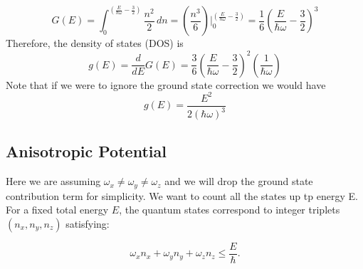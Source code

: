 \documentclass{article}
\numberwithin{equation}{section}
\numberwithin{equation}{subsection}
\begin{document}
\begin{equation}
    G(\mathit{E}) = \int_{0}^{(\frac{E}{\hbar\omega}-\frac{3}{2})} \frac{\mathit{n}^2}{2} \,d\mathit{n} = \left(\frac{\mathit{n}^3}{6}\right)\bigg|_{0}^{(\frac{E}{\hbar\omega}-\frac{3}{2})} = \frac{1}{6}\left(\frac{E}{\hbar\omega}-\frac{3}{2}\right)^3
\end{equation}
Therefore, the density of states (DOS) is 
\begin{equation}
    g(\mathit{E}) = \frac{d}{d E}G(\mathit{E}) = \frac{3}{6}\left(\frac{E}{\hbar\omega}-\frac{3}{2}\right)^2\left(\frac{1}{\hbar \omega}\right)
\end{equation}
Note that if we were to ignore the ground state correction we would have
\begin{equation}
    g(\mathit{E}) = \frac{E^2}{2(\hbar\omega)^3}
\end{equation}

\subsection{Anisotropic Potential}
Here we are assuming $\omega_{\mathit{x}} \neq \omega_{\mathit{y}} \neq \omega_{\mathit{z}}$ and we will drop the ground state contribution term for simplicity. We want to count all the states up tp energy E. For a fixed total energy \(E\), the quantum states correspond to integer triplets \((\mathit{n}_{\mathit{x}},\mathit{n}_{\mathit{y}},\mathit{n}_{\mathit{z}})\) satisfying:

\[
\omega_{\mathit{x}} \mathit{n}_{\mathit{x}} + \omega_{\mathit{y}} \mathit{n}_{\mathit{y}} + \omega_{\mathit{z}} \mathit{n}_{\mathit{z}} \leq \frac{E}{\hbar}.
\]
\end{document}
